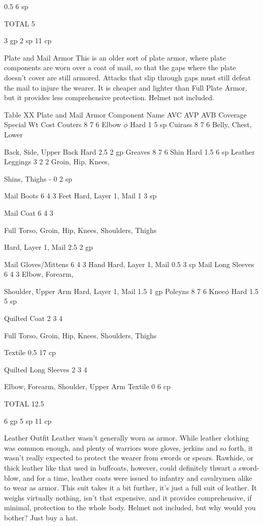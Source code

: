\documentclass[oneside,11pt,english]{book}
\begin{document}
0.5 6 sp

TOTAL 5

3 gp
2 sp
11 cp

Plate and Mail Armor
This is an older sort of plate armor, where plate components are worn over a coat of mail, so that the gaps where the 
plate doesn’t cover are still armored. Attacks that slip through gaps must still defeat the mail to injure the wearer. It is 
cheaper and lighter than Full Plate Armor, but it provides less comprehensive protection. Helmet not included.

Table XX Plate and Mail Armor 
Component Name AVC AVP AVB Coverage Special Wt Cost
Couters 8 7 6 Elbow $\phi$ Hard 1 5 sp
Cuirass 8 7 6 Belly, Chest, Lower 

Back, Side, Upper Back Hard 2.5 2 gp
Greaves 8 7 6 Shin Hard 1.5 6 sp
Leather Leggings 3 2 2 Groin, Hip, Knees, 

Shins, Thighs - 0 2 sp


Mail Boots 6 4 3 Feet Hard, Layer 1, Mail 1 3 sp

Mail Coat 6 4 3

Full Torso, Groin, Hip, 
Knees, Shoulders, 
Thighs

Hard, Layer 1, Mail 2.5 2 gp

Mail 
Gloves/Mittens 6 4 3 Hand Hard, Layer 1, Mail 0.5 3 sp
Mail Long Sleeves 6 4 3 Elbow, Forearm, 

Shoulder, Upper Arm Hard, Layer 1, Mail 1.5 1 gp
Poleyns 8 7 6 Knee$\phi$ Hard 1.5 5 sp

Quilted Coat 2 3 4

Full Torso, Groin, Hip, 
Knees, Shoulders, 
Thighs

Textile 0.5 17 cp

Quilted Long 
Sleeves 2 3 4

Elbow, Forearm, 
Shoulder, Upper Arm Textile 0 6 cp

TOTAL 12.5

6 gp
5 sp
11 cp

Leather Outfit
Leather wasn't generally worn as armor. While leather clothing was common enough, and plenty of warriors wore 
gloves, jerkins and so forth, it wasn't really expected to protect the wearer from swords or spears. Rawhide, or thick 
leather like that used in buffcoats, however, could definitely thwart a sword-blow, and for a time, leather coats were 
issued to infantry and cavalrymen alike to wear as armor. This suit takes it a bit further, it's just a full suit of leather. It 
weighs virtually nothing, isn’t that expensive, and it provides comprehensive, if minimal, protection to the whole 
body. Helmet not included, but why would you bother? Just buy a hat.
\end{document}
